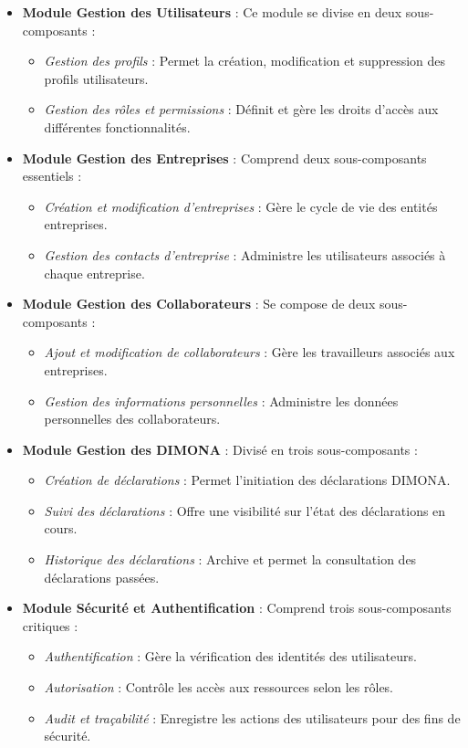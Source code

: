 \documentclass[12pt,a4paper]{report}
\begin{document}
\begin{itemize}
  \item \textbf{Module Gestion des Utilisateurs} : Ce module se divise en deux sous-composants :
    \begin{itemize}
      \item \textit{Gestion des profils} : Permet la création, modification et suppression des profils utilisateurs.
      \item \textit{Gestion des rôles et permissions} : Définit et gère les droits d'accès aux différentes fonctionnalités.
    \end{itemize}
  
  \item \textbf{Module Gestion des Entreprises} : Comprend deux sous-composants essentiels :
    \begin{itemize}
      \item \textit{Création et modification d'entreprises} : Gère le cycle de vie des entités entreprises.
      \item \textit{Gestion des contacts d'entreprise} : Administre les utilisateurs associés à chaque entreprise.
    \end{itemize}
  
  \item \textbf{Module Gestion des Collaborateurs} : Se compose de deux sous-composants :
    \begin{itemize}
      \item \textit{Ajout et modification de collaborateurs} : Gère les travailleurs associés aux entreprises.
      \item \textit{Gestion des informations personnelles} : Administre les données personnelles des collaborateurs.
    \end{itemize}
  
  \item \textbf{Module Gestion des DIMONA} : Divisé en trois sous-composants :
    \begin{itemize}
      \item \textit{Création de déclarations} : Permet l'initiation des déclarations DIMONA.
      \item \textit{Suivi des déclarations} : Offre une visibilité sur l'état des déclarations en cours.
      \item \textit{Historique des déclarations} : Archive et permet la consultation des déclarations passées.
    \end{itemize}
  
  \item \textbf{Module Sécurité et Authentification} : Comprend trois sous-composants critiques :
    \begin{itemize}
      \item \textit{Authentification} : Gère la vérification des identités des utilisateurs.
      \item \textit{Autorisation} : Contrôle les accès aux ressources selon les rôles.
      \item \textit{Audit et traçabilité} : Enregistre les actions des utilisateurs pour des fins de sécurité.
    \end{itemize}
\end{itemize}
\end{document}
